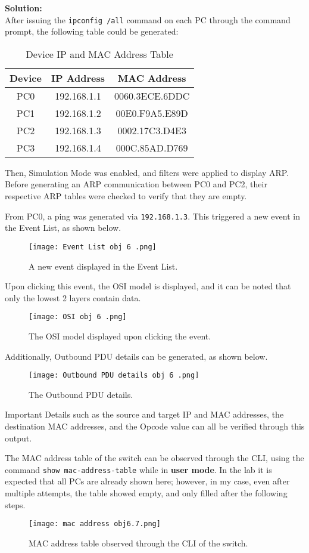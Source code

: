 \documentclass[a4paper,12pt]{article}
\begin{document}
\textbf{Solution:} \\
After issuing the \texttt{ipconfig /all} command on each PC through the command prompt, the following table could be generated:
\begin{table}[H]
\centering
\begin{tabular}{|c|c|c|}
\hline
\textbf{Device} & \textbf{IP Address} & \textbf{MAC Address} \\ \hline
PC0 & 192.168.1.1 & 0060.3ECE.6DDC \\ \hline
PC1 & 192.168.1.2 & 00E0.F9A5.E89D \\ \hline
PC2 & 192.168.1.3 & 0002.17C3.D4E3 \\ \hline
PC3 & 192.168.1.4 & 000C.85AD.D769 \\ \hline
\end{tabular}
\caption{Device IP and MAC Address Table}
\end{table}

Then, Simulation Mode was enabled, and filters were applied to display ARP.
Before generating an ARP communication between PC0 and PC2, their respective ARP tables were checked to verify that they are empty.

From PC0, a ping was generated via \texttt{192.168.1.3}. This triggered a new event in the Event List, as shown below. 
\begin{figure}[H]
\centering
\texttt{[image: Event List obj 6 .png]}
\caption{A new event displayed in the Event List.}
\end{figure}

Upon clicking this event, the OSI model is displayed, and it can be noted that only the lowest 2 layers contain data.
\begin{figure}[H]
\centering
\texttt{[image: OSI obj 6 .png]}
\caption{The OSI model displayed upon clicking the event.}
\end{figure}

Additionally, Outbound PDU details can be generated, as shown below.
\begin{figure}[H]
\centering
\texttt{[image: Outbound PDU details obj 6 .png]}
\caption{The Outbound PDU details.}
\end{figure}
Important Details such as the source and target IP and MAC addresses, the destination MAC addresses, and the Opcode value can all be verified through this output.

The MAC address table of the switch can be observed through the CLI, using the command \texttt{show mac-address-table} while in \textbf{user mode}. In the lab it is expected that all PCs are already shown here; however, in my case, even after multiple attempts, the table showed empty, and only filled after the following steps.
\begin{figure}[H]
\centering
\texttt{[image: mac address obj6.7.png]}
\caption{MAC address table observed through the CLI of the switch.}
\end{figure}
\end{document}
